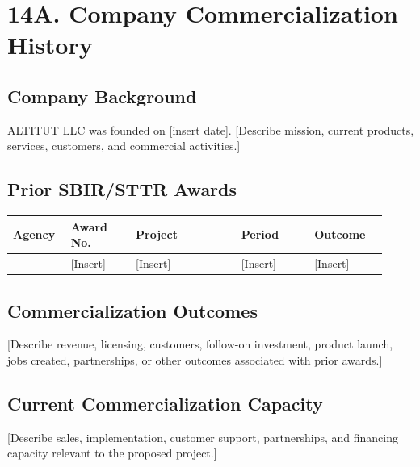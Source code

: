 \documentclass[11pt,letterpaper]{article}
\begin{document}
\section*{14A. Company Commercialization History}


\subsection*{Company Background}
ALTITUT LLC was founded on [insert date]. [Describe mission, current products,
services, customers, and commercial activities.]

\subsection*{Prior SBIR/STTR Awards}
\begin{longtable}{p{0.14\linewidth}p{0.16\linewidth}p{0.26\linewidth}p{0.18\linewidth}p{0.18\linewidth}}
\textbf{Agency} & \textbf{Award No.} & \textbf{Project} & \textbf{Period} & \textbf{Outcome} \\
\hline
[Insert or state none] & [Insert] & [Insert] & [Insert] & [Insert] \\
\end{longtable}

\subsection*{Commercialization Outcomes}
[Describe revenue, licensing, customers, follow-on investment, product launch,
jobs created, partnerships, or other outcomes associated with prior awards.]

\subsection*{Current Commercialization Capacity}
[Describe sales, implementation, customer support, partnerships, and financing
capacity relevant to the proposed project.]
\end{document}

